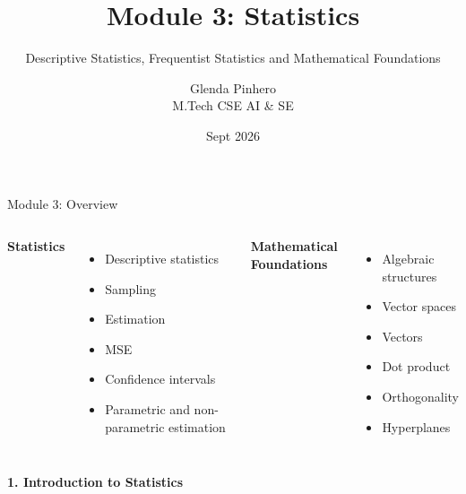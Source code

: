 \documentclass[aspectratio=169,11pt]{beamer}
\title{\textbf{Module 3: Statistics}}
\subtitle{Descriptive Statistics, Frequentist Statistics and Mathematical Foundations}
\author{Glenda Pinhero \\ M.Tech CSE  AI \& SE}
\institute{Cochin University of Science and Technology}
\date{Sept 2026}
\begin{document}
\begin{frame}
    \titlepage
\end{frame}

\begin{frame}{Module 3: Overview}

\begin{columns}[T]

\textbf{Statistics}
\begin{itemize}
    \item Descriptive statistics
    \item Sampling
    \item Estimation
    \item MSE
    \item Confidence intervals
    \item Parametric and non-parametric estimation
\end{itemize}

\textbf{Mathematical Foundations}
\begin{itemize}
    \item Algebraic structures
    \item Vector spaces
    \item Vectors
    \item Dot product
    \item Orthogonality
    \item Hyperplanes
\end{itemize}

\end{columns}
\end{frame}


\begin{frame}
\centering
\vfill
{\Huge\color{CUSATblue}\textbf{1. Introduction to Statistics}}
\vfill
\end{frame}
\end{document}
